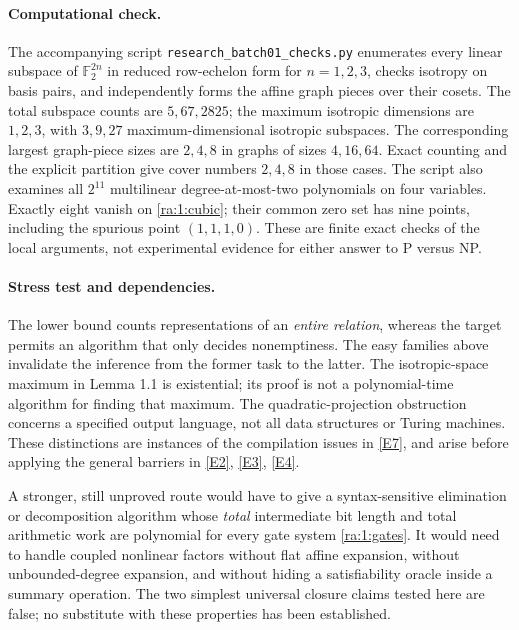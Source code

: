 \documentclass[11pt]{article}
\newcommand{\F}{\mathbb{F}}
\newcommand{\eref}[2]{\hyperlink{extra:#1:#2}{[E#2]}}
\begin{document}
\paragraph{Computational check.}
The accompanying script \texttt{research\_batch01\_checks.py} enumerates every
linear subspace of $\F_2^{2n}$ in reduced row-echelon form for $n=1,2,3$,
checks isotropy on basis pairs, and independently forms the affine graph
pieces over their cosets. The total subspace counts are $5,67,2825$; the
maximum isotropic dimensions are $1,2,3$, with $3,9,27$ maximum-dimensional
isotropic subspaces. The corresponding largest graph-piece sizes are $2,4,8$
in graphs of sizes $4,16,64$. Exact counting and the explicit partition give
cover numbers $2,4,8$ in those cases. The script also examines all $2^{11}$
multilinear degree-at-most-two polynomials on four variables. Exactly eight
vanish on \eqref{ra:1:cubic}; their common zero set has nine points, including
the spurious point $(1,1,1,0)$. These are finite exact checks of the local
arguments, not experimental evidence for either answer to P versus NP.

\paragraph{Stress test and dependencies.}
The lower bound counts representations of an \emph{entire relation}, whereas
the target permits an algorithm that only decides nonemptiness. The easy
families above invalidate the inference from the former task to the latter.
The isotropic-space maximum in Lemma 1.1 is existential; its proof is not a
polynomial-time algorithm for finding that maximum. The quadratic-projection
obstruction concerns a specified output language, not all data structures or
Turing machines. These distinctions are instances of the compilation issues
in \eref{1}{7}, and arise before applying the general barriers in
\eref{1}{2}, \eref{1}{3}, \eref{1}{4}.

A stronger, still unproved route would have to give a syntax-sensitive
elimination or decomposition algorithm whose \emph{total} intermediate bit
length and total arithmetic work are polynomial for every gate system
\eqref{ra:1:gates}. It would need to handle coupled nonlinear factors without
flat affine expansion, without unbounded-degree expansion, and without
hiding a satisfiability oracle inside a summary operation. The two simplest
universal closure claims tested here are false; no substitute with these
properties has been established.
\end{document}
